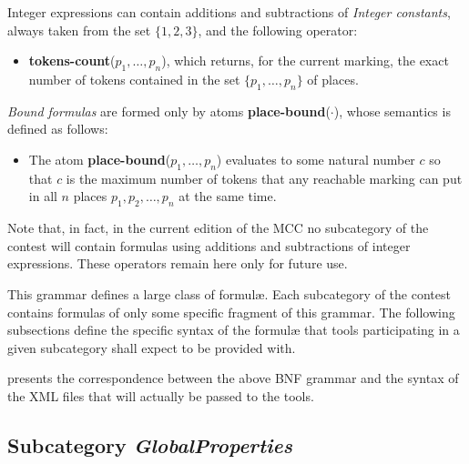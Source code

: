 \documentclass[10pt,english,a4paper]{article}
\newcommand\eqdef            {\mathrel{:=}}
\newcommand\set[1]           {{\{ #1 \mathclose \}}}
\newcommand\N                {\mathbb{N}}
\newcommand\atomplacebnd[1]  {\textbf{place-bound}(#1)}
\newcommand\atomtokenscnt[1] {\textbf{tokens-count}(#1)}
\newcommand{\mcc}[0]{MCC}
\newcommand\mysubsection[1]{\color{sectioncolor}\subsection{#1}\color{defaultcolor}}
\begin{document}
Integer expressions can contain additions and subtractions of
\emph{Integer constants}, always taken from the set $\set{1, 2, 3}$, and
the following operator:
\begin{itemize}
\item
  \atomtokenscnt{$p_1, \ldots, p_n$}, which returns, for the current
  marking, the exact number of tokens contained in the set
  $\set{p_1, \ldots, p_n}$ of places.
\end{itemize}

\textit{Bound formulas} are formed only by atoms \atomplacebnd{$\cdot$}, whose semantics
is defined as follows:
\begin{itemize}
\item
  The atom \atomplacebnd{$p_1, \ldots, p_n$} evaluates to some
  natural number $c$ so that $c$ is the maximum number of tokens that any reachable marking can put in all $n$
  places $p_1, p_2, \ldots, p_n$ at the same time.
\end{itemize}

Note that, in fact, in the current edition of the \mcc{} no subcategory of the
contest will contain formulas using additions and subtractions of integer
expressions. These operators remain here only for future use.


This grammar defines a large class of formulæ.
Each subcategory of the contest contains formulas of only some specific
fragment of this grammar.
The following subsections define the specific syntax of the formul\ae{}
that tools participating in a given subcategory shall expect to be provided
with.

 presents the correspondence between the above BNF grammar
and the syntax of the XML files that will actually be passed to the tools.

\mysubsection{Subcategory \textit{GlobalProperties}}
\end{document}
